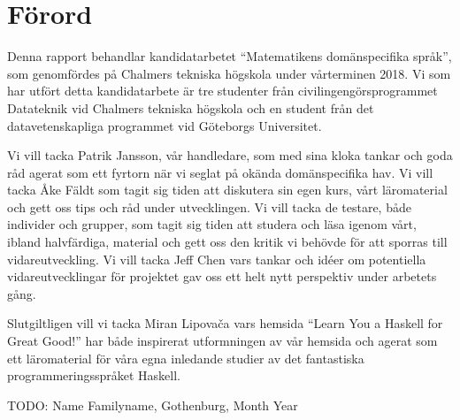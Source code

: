 \thispagestyle{plain}			%
\section*{Förord}

\begin{draft}

Denna rapport behandlar kandidatarbetet ``Matematikens domänspecifika språk'',
som genomfördes på Chalmers tekniska högskola under vårterminen 2018. Vi som har
utfört detta kandidatarbete är tre studenter från civilingengörsprogrammet
Datateknik vid Chalmers tekniska högskola och en student från det
datavetenskapliga programmet vid Göteborgs Universitet.

Vi vill tacka Patrik Jansson, vår handledare, som med sina kloka tankar och goda
råd agerat som ett fyrtorn när vi seglat på okända domänspecifika hav. Vi vill
tacka Åke Fäldt som tagit sig tiden att diskutera sin egen kurs, vårt
läromaterial och gett oss tips och råd under utvecklingen. Vi vill tacka de
testare, både individer och grupper, som tagit sig tiden att studera och läsa
igenom vårt, ibland halvfärdiga, material och gett oss den kritik vi behövde för
att sporras till vidareutveckling. Vi vill tacka Jeff Chen vars tankar och idéer
om potentiella vidareutvecklingar för projektet gav oss ett helt nytt perspektiv
under arbetets gång.

Slutgiltligen vill vi tacka Miran Lipovača vars hemsida ``Learn You a
Haskell for Great Good!'' har både inspirerat utformningen av vår hemsida och
agerat som ett läromaterial för våra egna inledande studier av det fantastiska
programmeringsspråket Haskell. 

\end{draft}

\vspace{1.5cm}
\hfill
TODO: Name Familyname, Gothenburg, Month Year

\newpage				%
\thispagestyle{empty}
\mbox{}
